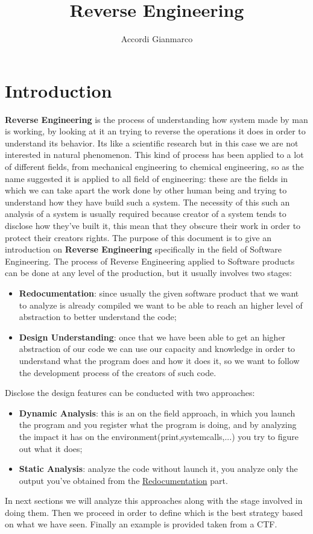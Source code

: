 \documentclass{article}
\author{Accordi Gianmarco}
\title{Reverse Engineering}
\date{}
\begin{document}
\maketitle

\section{Introduction}

\textbf{Reverse Engineering} is the process of understanding how system made by man is working, by looking at it an trying to reverse the operations it does in order to understand its behavior.
Its like a scientific research but in this case we are not interested in natural phenomenon.
This kind of process has been applied to a lot of different fields, from mechanical engineering to chemical engineering, so as the name suggested it is applied to all field of engineering: these are the fields in which we can take apart the work done by other human being and trying to understand how they have build such a system.
The necessity of this such an analysis of a system is usually required because creator of a system tends to disclose how they've built it, this mean that they obscure their work in order to protect their creators rights.
The purpose of this document is to give an introduction on \textbf{Reverse Engineering} specifically in the field of Software Engineering.
The process of Reverse Engineering applied to Software products can be done at any level of the production, but it usually involves two stages:
\begin{itemize}
    \item \textbf{Redocumentation}: since usually the given software product that we want to analyze is already compiled we want to be able to reach an higher level of abstraction to better understand the code;
    \item \textbf{Design Understanding}: once that we have been able to get an higher abstraction of our code we can use our capacity and knowledge in order to understand what the program does and how it does it, so we want to follow the development process of the creators of such code.
\end{itemize}
Disclose the design features can be conducted with two approaches:
\begin{itemize}
    \item \textbf{Dynamic Analysis}: this is an on the field approach, in which you launch the program and you register what the program is doing, and by analyzing the impact it has on the environment(print,systemcalls,...) you try to figure out what it does;
    \item \textbf{Static Analysis}: analyze the code without launch it, you analyze only the output you've obtained from the \underline{Redocumentation} part.
\end{itemize} 
In next sections we will analyze this approaches along with the stage involved in doing them.
Then we proceed in order to define which is the best strategy based on what we have seen. Finally an example is provided taken from a CTF. 
\end{document}
